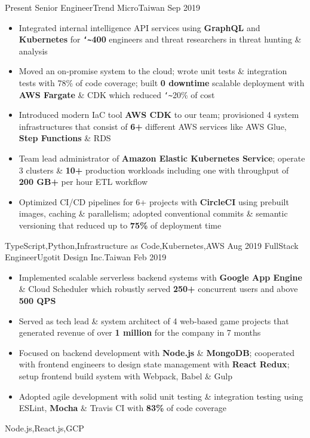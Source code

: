 \begin{experiences}
  \experience
    {Present}       {Senior Engineer}{Trend Micro}{Taiwan}
    {Sep 2019}      {
                      \begin{itemize}
                        \item{Integrated internal intelligence API services using \textbf{GraphQL} and \textbf{Kubernetes} for \textbf{\texttt{\char`\~}400} engineers and threat researchers in threat hunting \& analysis}
                        \item{Moved an on-promise system to the cloud; wrote unit tests \& integration tests with 78\% of code coverage; built \textbf{0 downtime} scalable deployment with \textbf{AWS Fargate} \& CDK which reduced \texttt{\char`\~}20\% of cost}
                        \item{Introduced modern IaC tool \textbf{AWS CDK} to our team; provisioned 4 system infrastructures that consist of \textbf{6+} different AWS services like AWS Glue, \textbf{Step Functions} \& RDS}
                        \item{Team lead administrator of \textbf{Amazon Elastic Kubernetes Service}; operate 3 clusters \& \textbf{10+} production workloads including one with throughput of \textbf{200 GB+} per hour ETL workflow}
                        \item{Optimized CI/CD pipelines for 6+ projects with \textbf{CircleCI} using prebuilt images, caching \& parallelism; adopted conventional commits \& semantic versioning that reduced up to \textbf{75\%} of deployment time}
                      \end{itemize}
                    }
                    {TypeScript,Python,Infrastructure as Code,Kubernetes,AWS}
  \emptySeparator
  \experience
    {Aug 2019}      {FullStack Engineer}{Ugotit Design Inc.}{Taiwan}
    {Feb 2019}      {
                      \begin{itemize}
                        \item{Implemented scalable serverless backend systems with \textbf{Google App Engine} \& Cloud Scheduler which robustly served \textbf{250+} concurrent users and above \textbf{500 QPS}}
                        \item{Served as tech lead \& system architect of 4 web‐based game projects that generated revenue of over \textbf{1 million} for the company in 7 months}
                        \item{Focused on backend development with \textbf{Node.js} \& \textbf{MongoDB}; cooperated with frontend engineers to design state management with \textbf{React Redux}; setup frontend build system with Webpack, Babel \& Gulp}
                        \item{Adopted agile development with solid unit testing \& integration testing using ESLint, \textbf{Mocha} \& Travis CI with \textbf{83\%} of code coverage}
                      \end{itemize}
                    }
                    {Node.js,React.js,GCP}
\end{experiences}
